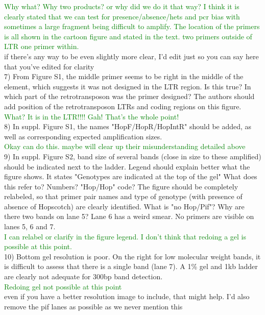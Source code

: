 \documentclass[11pt]{article}
\newcommand{\lev}[1]{\noindent \textcolor{green}{{#1}} \\}
\newcommand{\mbh}[1]{\noindent \textcolor{Dandelion}{{#1}}\\}
\begin{document}
\lev{Why what? Why two products? or why did we do it that way? I think it is clearly stated that we can test for presence/absence/hets and pcr bias with sometimes a large fragment being difficult to amplify. The location of the primers is all shown in the cartoon figure and stated in the text. two primers outside of LTR one primer within.}

\mbh{if there's any way to be even slightly more clear, I'd edit just so you can say here that you've edited for clarity}

7) From Figure S1, the middle primer seems to be right in the middle of the element, which suggests it was not designed in the LTR region. Is this true? In which part of the retrotransposon was the primer designed? The authors should add position of the retrotransposon LTRs and coding regions on this figure. \\

\lev{What? It is in the LTR!!!! Gah! That's the whole point!}

8) In suppl. Figure S1, the names "HopF/HopR/HopIntR" should be added, as well as corresponding expected amplification sizes.\\

\lev{Okay can do this. maybe will clear up their misunderstanding detailed above}

9) In suppl. Figure S2, band size of several bands (close in size to these amplified) should be indicated next to the ladder. Legend should explain better what the figure shows. It states "Genotypes are indicated at the top of the gel" What does this refer to? Numbers? "Hop/Hop" code? The figure should be completely relabeled, so that primer pair names and type of genotype (with presence of absence of Hopscotch) are clearly identified. What is "no Hop/Pif"? Why are there two bands on lane 5? Lane 6 has a weird smear. No primers are visible on lanes 5, 6 and 7.\\

\lev{I can relabel or clarify in the figure legend. I don't think that redoing a gel is possible at this point.}

10) Bottom gel resolution is poor. On the right for low molecular weight bands, it is difficult to assess that there is a single band (lane 7). A 1\% gel and 1kb ladder are clearly not adequate for 300bp band detection.\\

\lev{Redoing gel not possible at this point}

\mbh{even if you have a better resolution image to include, that might help.  I'd also remove the pif lanes as possible as we never mention this}
\end{document}
